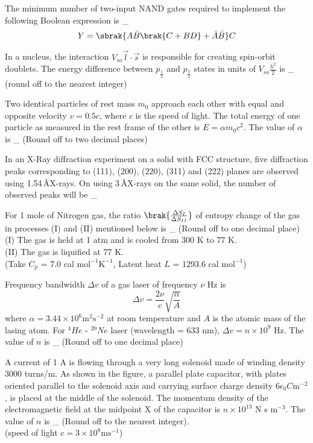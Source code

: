 \item The minimum number of two-input NAND gates required to implement the following Boolean expression is \_
$$Y = \sbrak{A\bar{B} \brak{C + BD} + \bar{A}\bar{B}}C$$

\item In a nucleus, the interaction $V_{so}\vec{l}\cdot\vec{s}$ is responsible for creating spin-orbit doublets. The energy difference between $p_{\frac{1}{2}}$ and $p_{\frac{3}{2}}$ states in units of $V_{so}\frac{h^2}{2}$ is \_ (round off to the nearest integer)

\item Two identical particles of rest mass $m_0$ approach each other with equal and opposite velocity $v=0.5c$, where $c$ is the speed of light. The total energy of one particle as measured in the rest frame of the other is $E=\alpha m_0c^2$. The value of $\alpha$ is \_ (Round off to two decimal places)

\item In an X-Ray diffraction experiment on a solid with FCC structure, five diffraction peaks corresponding to (111), (200), (220), (311) and (222) planes are observed using 1.54\,\AA X-rays. On using 3\,\AA X-rays on the same solid, the number of observed peaks will be \_

\item For 1 mole of Nitrogen gas, the ratio $\brak{\frac{\Delta S_I}{\Delta S_{II}}}$ of entropy change of the gas in processes (I) and (II) mentioned below is \_ (Round off to one decimal place)
\\
(I) The gas is held at 1 atm and is cooled from 300 K to 77 K.
\\
(II) The gas is liquified at 77 K.
\\
(Take $C_p$ = 7.0 cal $\mathrm{mol}^{-1}$$\mathrm{K}^{-1}$, Latent heat $L$ = 1293.6 cal $\mathrm{mol}^{-1}$)

\item Frequency bandwidth $\Delta v$ of a gas laser of frequency $\nu$ Hz is 
$$\Delta v = \frac{2\nu}{c} \sqrt{\frac{\alpha}{A}}$$
where $\alpha = 3.44 \times 10^6 \mathrm{m}^{2} \mathrm{s}^{-2}$ at room temperature and $A$ is the atomic mass of the lasing atom. For ${}^{4}He$ - ${}^{20}Ne$ laser (wavelength = 633 nm), $\Delta v = n \times 10^9$ Hz. The value of $n$ is \_ (Round off to one decimal place) 

\item A current of 1 A is flowing through a very long solenoid made of winding density 3000 turns/m. As shown in the figure, a parallel plate capacitor, with plates oriented parallel to the solenoid axis and carrying surface charge density $6\epsilon_0C\mathrm{m}^{-2}$, is placed at the middle of the solenoid. The momentum density of the electromagnetic field at the midpoint X of the capacitor is $n \times 10^{13}$ N s $\mathrm{m}^{-3}$. The value of $n$ is \_ (Round off to the nearest integer). 
\\ (speed of light $c = 3 \times 10^8 \mathrm{ms}^{-1}$)


